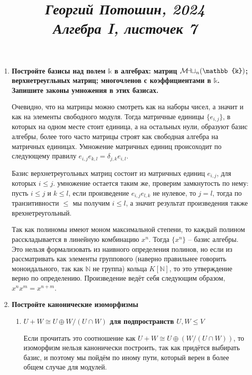 \documentclass{article}
\title{
\textit{\small{Георгий Потошин, 2024}}\\
\vspace{0.3ex}
\textit{\huge{Алгебра I, листочек 7}}\vspace{1ex}
}
\date{\vspace{-10ex}}
\newcommand{\mymat}{\mathcal{M\mkern-3mu a\mkern-0.3mu t}}
\begin{document}
\maketitle

\begin{enumerate}
    \item \textbf{Постройте базисы над полем $\mathbb{k}$ в алгебрах: матриц $\mymat_n(\mathbb{k})$;
        верхнетреугльных матриц; многочленов с коэффициентами в $\mathbb{k}$. Запишите законы умножения
        в этих базисах.}

        Очевидно, что на матрицы можно смотреть как на наборы чисел, а значит и как на элементы свободного модуля.
        Тогда матричные единицы $\{e_{i,j}\}$, в которых на одном месте стоит единица, а  на остальных нули,
        образуют базис алгебры, более того часто матрицы строят как свободная алгебра на матричных единицах. Умножение
        матричных единиц происоходит по следующему правилу $e_{i,j}e_{k,l}=\delta_{j,k}e_{i,l}$.

        Базис верхнетреугольных матриц состоит из матричных единиц $e_{i,j}$, для которых $i\leq j$. умножение остается
        таким же, проверим замкнутость по нему: пусть $i\leq j$ и $k\leq l$, если произведение $e_{i,j}e_{l,k}$ не нулевое,
        то $j=l$, тогда по транзитивности $\leq$ мы получим $i\leq l$, а значит результат произведения также врехнетреугольный.

        Так как полиномы имеют моном максимальной степени, то каждый полином расскладывается в линейную комбинацию $x^n$.
        Тогда $\{x^n\}$ – базис алгебры. Это нельзя формализовать из наивного определения полинов, но если из рассматривать
        как элементы группового (наверно правильнее говорить моноидального, так как $\mathbb{N}$ не группа) кольца
        $K[\mathbb{N}]$, то это утверждение верно по определению. Произведение ведёт себя следующим образом, $x^nx^m=x^{n+m}$.

    \item \textbf{Постройте канонические изоморфизмы}
        \begin{enumerate} 
            \item \textbf{$U+W\cong U\oplus W/(U\cap W)$ для подпространств $U,W\leq V$}

                Если прочитать это соотношение как $U+W\cong U\oplus (W/(U\cap W))$, то изоморфизм нельзя канонически
                построить, так как придётся выбирать базис, и поэтому мы пойдём по иному пути, который верен в более общем
                случае для модулей.


\end{enumerate}
\end{enumerate}
\end{document}
